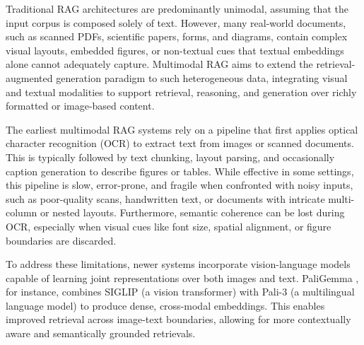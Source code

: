 \documentclass[12pt,twoside]{report}
\begin{document}
Traditional RAG architectures are predominantly unimodal, assuming that the input corpus is composed solely of text. However, many real-world documents, such as scanned PDFs, scientific papers, forms, and diagrams, contain complex visual layouts, embedded figures, or non-textual cues that textual embeddings alone cannot adequately capture. Multimodal RAG aims to extend the retrieval-augmented generation paradigm to such heterogeneous data, integrating visual and textual modalities to support retrieval, reasoning, and generation over richly formatted or image-based content.


The earliest multimodal RAG systems rely on a pipeline that first applies optical character recognition (OCR) to extract text from images or scanned documents. This is typically followed by text chunking, layout parsing, and occasionally caption generation to describe figures or tables. While effective in some settings, this pipeline is slow, error-prone, and fragile when confronted with noisy inputs, such as poor-quality scans, handwritten text, or documents with intricate multi-column or nested layouts. Furthermore, semantic coherence can be lost during OCR, especially when visual cues like font size, spatial alignment, or figure boundaries are discarded.

To address these limitations, newer systems incorporate vision-language models capable of learning joint representations over both images and text. PaliGemma \cite{PaliGemma}, for instance, combines SIGLIP\cite{SIGLIP} (a vision transformer) with Pali-3\cite{Pali3} (a multilingual language model) to produce dense, cross-modal embeddings. This enables improved retrieval across image-text boundaries, allowing for more contextually aware and semantically grounded retrievals.
\end{document}
